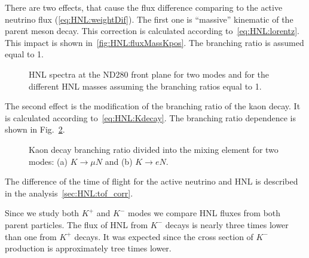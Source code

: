 \documentclass[../main.tex]{subfiles}
\begin{document}
There are two effects, that cause the flux difference comparing to the active neutrino flux (\autoref{eq:HNL:weightDif}). The first one is ``massive'' kinematic of the parent meson decay. This correction is calculated according to~\autoref{eq:HNL:lorentz}. This impact is shown in~\autoref{fig:HNL:fluxMassKpos}. The branching ratio is assumed equal to 1.
\begin{figure}[!ht]
    \begin{minipage}{0.49\linewidth}
    \end{minipage}
    \hfill
    \begin{minipage}{0.49\linewidth}
    \end{minipage}
    \caption{HNL spectra at the ND280 front plane for two modes and for the different HNL masses assuming the branching ratios equal to 1.}
    \label{fig:HNL:fluxMassKpos}
\end{figure}

The second effect is the modification of the branching ratio of the kaon decay. It is calculated according to~\autoref{eq:HNL:Kdecay}. The branching ratio dependence is shown in Fig.~\ref{fig:HNL:KdecayBR}.
\begin{figure}[!ht]
    \begin{minipage}[!ht]{0.49\linewidth}
    \end{minipage}
    \hfill
    \begin{minipage}[!ht]{0.49\linewidth}
    \end{minipage}
    \caption{Kaon decay branching ratio divided into the mixing element for two modes: (a) $K\to \mu N$ and (b) $K\to eN$.}
    \label{fig:HNL:KdecayBR}
\end{figure}

The difference of the time of flight for the active neutrino and HNL is described in the analysis~\autoref{sec:HNL:tof_corr}.

Since we study both $K^+$ and $K^-$ modes we compare HNL fluxes from both parent particles. The flux of HNL from $K^-$ decays is nearly three times lower than one from $K^+$ decays. It was expected since the cross section of $K^-$ production is approximately  tree times lower.
\end{document}
